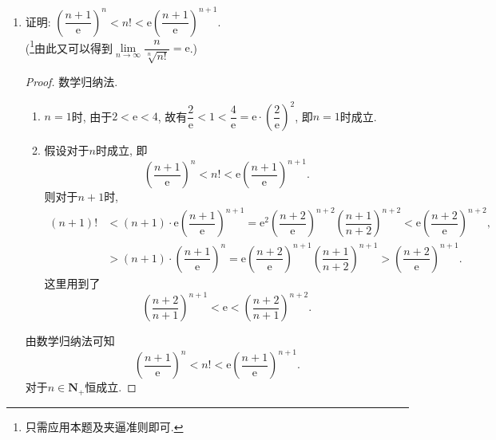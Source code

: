 \documentclass[a4paper,11pt,twoside]{ctexbook}
\newcommand{\e}{\mathrm e}
\begin{document}
\begin{enumerate}
	\item 证明: $\left(\dfrac{n+1}{\e}\right)^n<n!<\e\left(\dfrac{n+1}{\e}\right)^{n+1}$.\\
	      (\footnote{只需应用本题及夹逼准则即可.}由此又可以得到$\lim\limits_{n\to\infty} \dfrac{n}{\sqrt[n]{n!}}=\e$.)
	      \begin{proof}
		      数学归纳法.
		      \begin{enumerate}[(1)]
			      \item $n=1$时, 由于$2<\e<4$, 故有$\dfrac{2}{\e}<1<\dfrac{4}{\e}=\e\cdot\left(\dfrac{2}{\e}\right)^2$, 即$n=1$时成立.
			      \item 假设对于$n$时成立, 即
			            \[
				            \left(\dfrac{n+1}{\e}\right)^n<n!<\e\left(\dfrac{n+1}{\e}\right)^{n+1}.
			            \]
			            则对于$n+1$时,
			            \[
				            \begin{split}
					            (n+1)!&<(n+1)\cdot\e\left(\dfrac{n+1}{\e}\right)^{n+1}
					            =\e^2\left(\dfrac{n+2}{\e}\right)^{n+2}\left(\dfrac{n+1}{n+2}\right)^{n+2}<\e\left(\dfrac{n+2}{\e}\right)^{n+2},\\
					            &>(n+1)\cdot\left(\dfrac{n+1}{\e}\right)^{n}
					            =\e\left(\dfrac{n+2}{\e}\right)^{n+1}\left(\dfrac{n+1}{n+2}\right)^{n+1}>\left(\dfrac{n+2}{\e}\right)^{n+1}.
				            \end{split}
			            \]
			            这里用到了
			            \[
				            \left(\dfrac{n+2}{n+1}\right)^{n+1}<\e<\left(\dfrac{n+2}{n+1}\right)^{n+2}.
			            \]
		      \end{enumerate}
		      由数学归纳法可知
		      \[
			      \left(\dfrac{n+1}{\e}\right)^n<n!<\e\left(\dfrac{n+1}{\e}\right)^{n+1}.
		      \]
		      对于$n\in\mathbf{N}_{+}$恒成立.\qedhere
	      \end{proof}


\end{enumerate}
\end{document}
